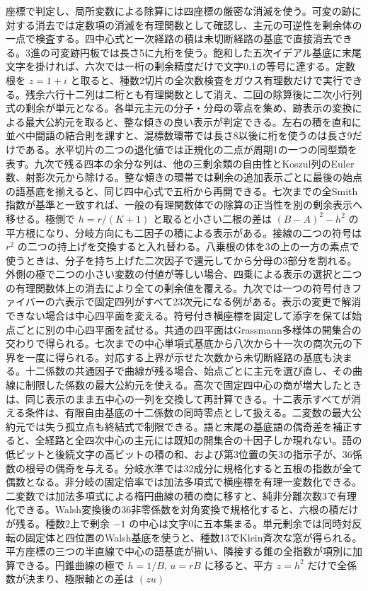 \documentclass[11pt,a4paper]{ltjsarticle}
\begin{document}
座標で判定し、局所変数による除算には四座標の厳密な消滅を使う。可変の跡に対する消去では定数項の消滅を有理関数として確認し、主元の可逆性を剰余体の一点で検査する。四中心式と一次経路の積は未切断経路の基底で直接消去できる。3進の可変跡円板では長さ5に九桁を使う。飽和した五次イデアル基底に末尾文字を掛ければ、六次では一桁の剰余精度だけで文字0,1の等号に達する。定数根を $z=1+i$ と取ると、種数2切片の全次数検査をガウス有理数だけで実行できる。残余六行十二列は二桁とも有理関数として消え、二回の除算後に二次小行列式の剰余が単元となる。各単元主元の分子・分母の零点を集め、跡表示の変換による最大公約元を取ると、整な傾きの良い表示が判定できる。左右の積を直和に並べ中間語の結合則を課すと、混標数環帯では長さ8以後に桁を使うのは長さ9だけである。水平切片の二つの退化値では正規化の二点が周期1の一つの同型類を表す。九次で残る四本の余分な列は、他の三剰余類の自由性とKoszul列のEuler数、射影次元から除ける。整な傾きの環帯では剰余の追加表示ごとに最後の始点の語基底を揃えると、同じ四中心式で五桁から再開できる。七次までの全Smith指数が基準と一致すれば、一般の有理関数体での除算の正当性を別の剰余表示へ移せる。極側で $h=r/(K+1)$ と取ると小さい二根の差は $(B-A)^2-h^2$ の平方根になり、分岐方向にも二因子の積による表示がある。接線の二つの符号は $r^2$ の二つの持上げを交換すると入れ替わる。八乗根の体を3の上の一方の素点で使うときは、分子を持ち上げた二次因子で還元してから分母の3部分を割れる。外側の極で二つの小さい変数の付値が等しい場合、四乗による表示の選択と二つの有理関数体上の消去により全ての剰余値を覆える。九次では一つの符号付きファイバーの六表示で固定四列がすべて23次元になる例がある。表示の変更で解消できない場合は中心四平面を変える。符号付き横座標を固定して添字を保てば始点ごとに別の中心四平面を試せる。共通の四平面はGrassmann多様体の開集合の交わりで得られる。七次までの中心単項式基底から八次から十一次の商次元の下界を一度に得られる。対応する上界が示せた次数から未切断経路の基底も決まる。十二係数の共通因子で曲線が残る場合、始点ごとに主元を選び直し、その曲線に制限した係数の最大公約元を使える。高次で固定四中心の商が増大したときは、同じ表示のまま五中心の一列を交換して再計算できる。十二表示すべてが消える条件は、有限自由基底の十二係数の同時零点として扱える。二変数の最大公約元では失う孤立点も終結式で制限できる。語と末尾の基底語の偶奇差を補正すると、全経路と全四次中心の主元には既知の開集合の十因子しか現れない。語の低ビットと後続文字の高ビットの積の和、および第3位置の矢3の指示子が、36係数の根号の偶奇を与える。分岐水準では32成分に規格化すると五根の指数が全て偶数となる。非分岐の固定倍率では加法多項式で横座標を有理一変数化できる。二変数では加法多項式による楕円曲線の積の商に移すと、純非分離次数3で有理化できる。Walsh変換後の36非零係数を対角変換で規格化すると、六根の積だけが残る。種数2上で剰余 $-1$ の中心は文字0に五本集まる。単元剰余では同時対反転の固定体と四位置のWalsh基底を使うと、種数13でKlein斉次な窓が得られる。平方座標の三つの半直線で中心の語基底が揃い、隣接する錐の全指数が項別に加算できる。円錐曲線の極で $h=1/B$, $u=rB$ に移ると、平方 $z=h^2$ だけで全係数が決まり、極限軸との差は $(zu)$ 
\end{document}
